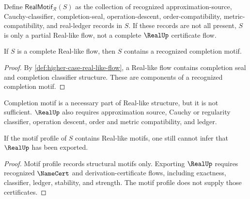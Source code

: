 \begin{definition}
\label{def:higher-case-real-motif-bundle}
Define $\mathsf{RealMotif}_{\mathcal R}(S)$ as the collection of recognized approximation-source, Cauchy-classifier, completion-seal, operation-descent, order-compatibility, metric-compatibility, and real-ledger records in $S$. If these records are not all present, $S$ is only a partial Real-like flow, not a complete $\RealUp$ certificate flow.
\end{definition}

\begin{proposition}
\label{prop:higher-case-real-extends-completion}
If $S$ is a complete Real-like flow, then $S$ contains a recognized completion motif.
\end{proposition}

\begin{proof}
By \autoref{def:higher-case-real-like-flow}, a Real-like flow contains completion seal and completion classifier structure. These are components of a recognized completion motif.
\end{proof}

\begin{corollary}
\label{cor:higher-case-completion-necessary-not-sufficient-real}
Completion motif is a necessary part of Real-like structure, but it is not sufficient. $\RealUp$ also requires approximation source, Cauchy or regularity classifier, operation descent, order and metric compatibility, and ledger.
\end{corollary}

\begin{theorem}
\label{thm:higher-case-real-profile-not-export}
If the motif profile of $S$ contains Real-like motifs, one still cannot infer that $\RealUp$ has been exported.
\end{theorem}

\begin{proof}
Motif profile records structural motifs only. Exporting $\RealUp$ requires recognized $\NameCert$ and derivation-certificate flows, including exactness, classifier, ledger, stability, and strength. The motif profile does not supply those certificates.
\end{proof}

